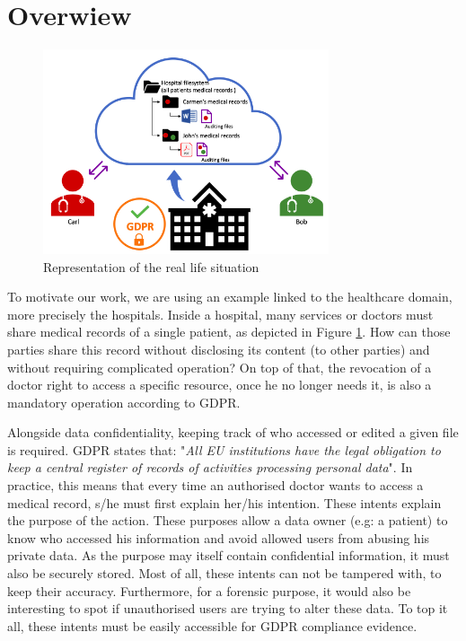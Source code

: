 \documentclass[../main.tex]{subfiles}
\begin{document}
\section{Overwiew}
\label{section:problem:overview}

\begin{figure}[h]
    \centering
    \includegraphics[width=0.75\textwidth]{images/problem/overview}
    
    \caption{Representation of the real life situation}
    \label{figure:problem:overview}
\end{figure}

\par To motivate our work, we are using an example linked to the healthcare domain, more precisely the hospitals. Inside a hospital, many services or doctors must share medical records of a single patient, as depicted in Figure \ref{figure:problem:overview}. How can those parties share this record without disclosing its content (to other parties) and without requiring complicated operation? On top of that, the revocation of a doctor right to access a specific resource, once he no longer needs it, is also a mandatory operation according to GDPR.

\medbreak
\par Alongside data confidentiality, keeping track of who accessed or edited a given file is required. GDPR states that: "\textit{All EU institutions have the legal obligation to keep a central register of records of activities processing personal data}". In practice, this means that every time an authorised doctor wants to access a medical record, s/he must first explain her/his intention. These intents explain the purpose of the action. These purposes allow a data owner (e.g: a patient) to know who accessed his information and avoid allowed users from abusing his private data. As the purpose may itself contain confidential information, it must also be securely stored. Most of all, these intents can not be tampered with, to keep their accuracy. Furthermore, for a forensic purpose, it would also be interesting to spot if unauthorised users are trying to alter these data. To top it all, these intents must be easily accessible for GDPR compliance evidence.
\end{document}
